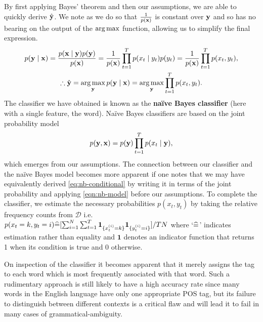 \documentclass[../main.tex]{subfiles}
\begin{document}
By first applying Bayes' theorem and then our assumptions, we are able to quickly derive $\hat{\mathbf{y}}$. We note as we do so that $\frac{1}{p(\mathbf{x})}$ is constant over $\mathbf{y}$ and so has no bearing on the output of the $\operatorname*{arg\,max}$ function, allowing us to simplify the final expression.
\begin{gather}
    p(\mathbf{y} \mid \mathbf{x}) = \frac{p(\mathbf{x} \mid \mathbf{y})p(\mathbf{y})}{p(\mathbf{x})} = \frac{1}{p(\mathbf{x})}\prod_{t=1}^T p(x_t \mid y_t)p(y_t) = \frac{1}{p(\mathbf{x})}\prod_{t=1}^T p(x_t, y_t), \label{eq:nb-conditional} \\
    \therefore \hat{\mathbf{y}} = \operatorname*{arg\,max}_{\mathbf{y}} p(\mathbf{y} \mid \mathbf{x}) = \operatorname*{arg\,max}_{\mathbf{y}} \prod_{t=1}^T p(x_t, y_t).
\end{gather}
The classifier we have obtained is known as the \textbf{na{\"i}ve Bayes classifier} (here with a single feature, the word). Na{\"i}ve Bayes classifiers are based on the joint probability model
\begin{equation} \label{eqn:nb-model}
    p(\mathbf{y},\mathbf{x}) = p(\mathbf{y})\prod_{t=1}^T p(x_t \mid \mathbf{y}),
\end{equation}
which emerges from our assumptions.
The connection between our classifier and the na{\"i}ve Bayes model becomes more apparent if one notes that we may have equivalently derived \cref{eq:nb-conditional} by writing it in terms of the joint probability and applying \cref{eqn:nb-model} before our assumptions.
To complete the classifier, we estimate the necessary probabilities $p(x_t,y_t)$ by taking the relative frequency counts from $\mathcal{D}$ i.e. $p(x_t = k,y_t = i) \widehat{=} [ \sum_{i=1}^N \sum_{t=1}^T \mathbf{1}_{\{x^{(i)}_t=k\}}\mathbf{1}_{\{y^{(i)}_t=i\}} ] / TN$ where `$\widehat{=}$' indicates estimation rather than equality and $\mathbf{1}$ denotes an indicator function that returns 1 when its condition is true and 0 otherwise.

On inspection of the classifier it becomes apparent that it merely assigns the tag to each word which is most frequently associated with that word.
Such a rudimentary approach is still likely to have a high accuracy rate since many words in the English language have only one appropriate POS tag, but its failure to distinguish between different contexts is a critical flaw and will lead it to fail in many cases of grammatical-ambiguity.
\end{document}
